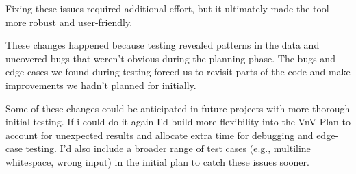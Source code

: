 \documentclass[12pt, titlepage]{article}
\begin{document}
\begin{itemize}
    Fixing these issues required additional effort, but it ultimately
    made the tool more robust and user-friendly.


    These changes happened because testing revealed patterns in the data
    and uncovered bugs that weren't obvious during the planning phase.
    The bugs and edge cases we found during testing forced us to
    revisit parts of the code and make improvements we hadn't planned
    for initially.

    Some of these changes could be anticipated in future projects
    with more thorough initial testing.
    If i could do it again I'd build more flexibility into the VnV
    Plan to account for unexpected results and allocate extra time
    for debugging and edge-case testing. I'd also include a broader
    range of test cases (e.g., multiline whitespace, wrong input) in
    the initial plan to catch these issues sooner.

\end{itemize}
\end{document}
